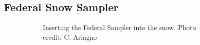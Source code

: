 \documentclass{sfuthesis}
\begin{document}
 \subsection{Federal Snow Sampler}
\label{sec:SWE}
 
\begin{figure}
    \centering
    \begin{subfigure}[b]{0.39\textwidth}
        \caption{Inserting the Federal Sampler into the snow. Photo credit: C. Ariagno}
        \label{photo_swe1}
    \end{subfigure}
    ~
    \begin{subfigure}[b]{0.55\textwidth}

\end{subfigure}
\end{figure}
\end{document}
